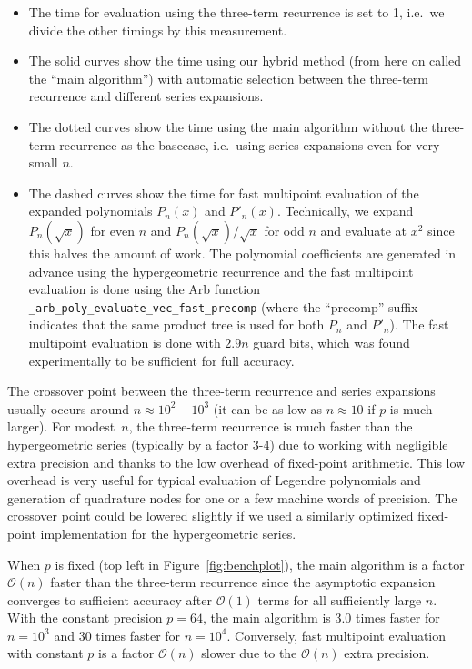 \documentclass{siamart0216}
\newcommand{\OO}{\mathcal{O}}
\begin{document}
\begin{itemize}
\item The time for evaluation using the three-term recurrence is set to 1, i.e.\ we divide
the other timings by this measurement.
\item The solid curves show the time using our hybrid method
(from here on called the ``main algorithm'')
with automatic selection between the three-term
recurrence and different
series expansions.
\item The dotted curves show the time using the main algorithm without
the three-term recurrence as the basecase, i.e.\ using series expansions
even for very small $n$.
\item The dashed curves show the time for fast multipoint
evaluation of the expanded polynomials $P_n(x)$ and $P'_n(x)$.
Technically, we expand
$P_{n}(\sqrt{x})$ for even $n$ and $P_{n}(\sqrt{x})/\sqrt{x}$ for odd $n$
and evaluate at $x^2$ since this halves the amount of work.
The polynomial coefficients are generated in advance using
the hypergeometric recurrence and
the fast multipoint evaluation is done using
the Arb function \texttt{\_arb\_poly\_evaluate\_vec\_fast\_precomp}
(where the ``precomp'' suffix indicates that
the same product tree is used for both $P_n$ and $P'_n$).
The fast multipoint evaluation is done with $2.9n$ guard bits,
which was found experimentally to be sufficient for full accuracy.
\end{itemize}

The crossover point between the
three-term recurrence and series expansions usually occurs
around $n \approx 10^2 - 10^3$ (it can be as low as $n \approx 10$
if $p$ is much larger).
For modest $n$,
the three-term recurrence is much faster
than the hypergeometric series (typically by a factor 3-4)
due to working with negligible extra precision
and thanks to the low overhead of fixed-point arithmetic.
This low overhead is very useful for typical evaluation of
Legendre polynomials and generation of quadrature nodes
for one or a few machine words of precision.
The crossover point could be lowered slightly
if we used a similarly optimized fixed-point implementation
for the hypergeometric series.

When $p$ is fixed (top left in Figure~\ref{fig:benchplot}), the main algorithm is
a factor $\OO(n)$ faster
than the three-term recurrence
since the asymptotic expansion converges to sufficient accuracy after
$\OO(1)$ terms for all sufficiently large $n$.
With the constant precision $p = 64$,
the main algorithm is 3.0
times faster for $n = 10^3$ and 30 times faster for $n = 10^4$.
Conversely, fast multipoint evaluation
with constant $p$ is a factor $\OO(n)$ slower due to the $\OO(n)$ extra precision.
\end{document}
